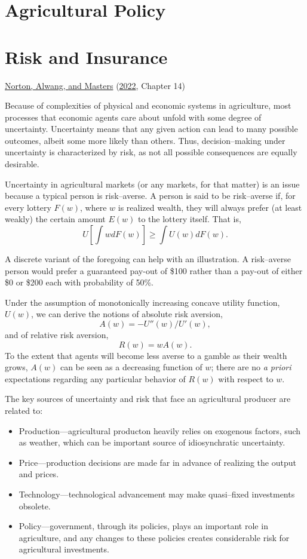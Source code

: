 \documentclass[
  oneside]{book}
\providecommand{\tightlist}{%
  \setlength{\itemsep}{0pt}\setlength{\parskip}{0pt}}
\begin{document}
\hypertarget{agricultural-policy}{%
\chapter*{Agricultural Policy}\label{agricultural-policy}}

\hypertarget{risk-and-insurance}{%
\chapter{Risk and Insurance}\label{risk-and-insurance}}

\protect\hyperlink{ref-norton2022}{Norton, Alwang, and Masters} (\protect\hyperlink{ref-norton2022}{2022}, Chapter 14)

Because of complexities of physical and economic systems in agriculture, most processes that economic agents care about unfold with some degree of uncertainty. Uncertainty means that any given action can lead to many possible outcomes, albeit some more likely than others. Thus, decision--making under uncertainty is characterized by risk, as not all possible consequences are equally desirable.

Uncertainty in agricultural markets (or any markets, for that matter) is an issue because a typical person is risk--averse. A person is said to be risk--averse if, for every lottery \(F(w)\), where \(w\) is realized wealth, they will always prefer (at least weakly) the certain amount \(E(w)\) to the lottery itself. That is, \[U\left[\int w dF(w)\right] \ge \int U(w)dF(w).\]

A discrete variant of the foregoing can help with an illustration. A risk--averse person would prefer a guaranteed pay-out of \$100 rather than a pay-out of either \$0 or \$200 each with probability of 50\%.

Under the assumption of monotonically increasing concave utility function, \(U(w)\), we can derive the notions of absolute risk aversion, \[A(w) = -U''(w)/U'(w),\] and of relative risk aversion, \[R(w) = wA(w).\] To the extent that agents will become less averse to a gamble as their wealth grows, \(A(w)\) can be seen as a decreasing function of \(w\); there are no \emph{a priori} expectations regarding any particular behavior of \(R(w)\) with respect to \(w\).

The key sources of uncertainty and risk that face an agricultural producer are related to:

\begin{itemize}
\tightlist
\item
  Production---agricultural producton heavily relies on exogenous factors, such as weather, which can be important source of idiosynchratic uncertainty.
\item
  Price---production decisions are made far in advance of realizing the output and prices.
\item
  Technology---technological advancement may make quasi--fixed investments obsolete.
\item
  Policy---government, through its policies, plays an important role in agriculture, and any changes to these policies creates considerable risk for agricultural investments.
\end{itemize}
\end{document}
